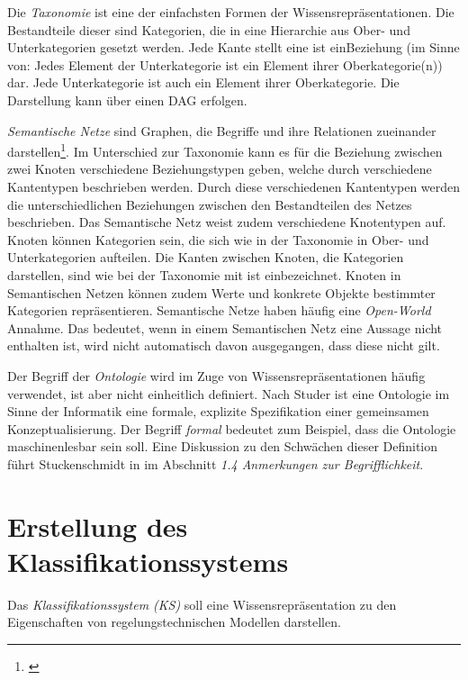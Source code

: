 Die \textit{Taxonomie} ist eine der einfachsten Formen der Wissensrepräsentationen. Die Bestandteile dieser sind Kategorien, die in eine Hierarchie aus Ober- und Unterkategorien gesetzt werden. Jede Kante stellt eine \glqq ist ein\grqq Beziehung (im Sinne von: Jedes Element der Unterkategorie ist ein Element ihrer Oberkategorie(n)) dar. Jede Unterkategorie ist auch ein Element ihrer Oberkategorie. Die Darstellung kann über einen DAG erfolgen.

\textit{Semantische Netze} \glqq sind Graphen, die Begriffe und ihre Relationen zueinander darstellen\grqq\footnote{\cite[S.28]{STU09}}. Im Unterschied zur Taxonomie kann es für die Beziehung zwischen zwei Knoten verschiedene Beziehungstypen geben, welche durch verschiedene Kantentypen beschrieben werden. Durch diese verschiedenen Kantentypen werden die unterschiedlichen Beziehungen zwischen den Bestandteilen des Netzes beschrieben. Das Semantische Netz weist zudem verschiedene Knotentypen auf. Knoten können Kategorien sein, die sich wie in der Taxonomie in Ober- und Unterkategorien aufteilen. Die Kanten zwischen Knoten, die Kategorien darstellen, sind wie bei der Taxonomie mit \glqq ist ein\grqq bezeichnet. Knoten in Semantischen Netzen können zudem Werte und konkrete Objekte bestimmter Kategorien repräsentieren.
Semantische Netze haben häufig eine \textit{Open-World} Annahme. Das bedeutet, wenn in einem Semantischen Netz eine Aussage nicht enthalten ist, wird nicht automatisch davon ausgegangen, dass diese nicht gilt.

Der Begriff der \textit{Ontologie} wird im Zuge von Wissensrepräsentationen häufig verwendet, ist aber nicht einheitlich definiert. Nach Studer \cite{STBEFE98} ist eine Ontologie im Sinne der Informatik eine \glqq formale, explizite Spezifikation einer gemeinsamen Konzeptualisierung\grqq. Der Begriff \textit{formal} bedeutet zum Beispiel, dass die Ontologie maschinenlesbar sein soll. Eine Diskussion zu den Schwächen dieser Definition führt Stuckenschmidt in \cite{STU09} im Abschnitt \textit{1.4 Anmerkungen zur Begrifflichkeit}. 

\section{Erstellung des Klassifikationssystems}
\label{Ch:Vorbetrachtung:Sec:KS}
Das \textit{Klassifikationssystem (KS)} soll eine Wissensrepräsentation zu den Eigenschaften von regelungstechnischen Modellen darstellen. 

